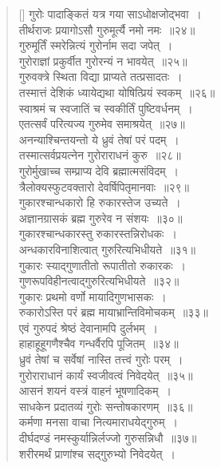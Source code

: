 \documentclass[twoside,12pt,notitlepage]{book}
\begin{document}
\begin{verse}[\versewidth]
गुरोः पादाङ्कितं यत्र गया साऽधोक्षजोद्भवा~।\\[-6pt]
तीर्थराजः प्रयागोऽसौ गुरुमूर्त्यै नमो नमः~॥२४॥\\
गुरुमूर्तिं स्मरेन्नित्यं गुरोर्नाम सदा जपेत्~।\\[-6pt]
गुरोराज्ञां प्रकुर्वीत गुरोरन्यं न भावयेत्~॥२५॥\\
गुरुवक्त्रे स्थिता  विद्या प्राप्यते तत्प्रसादतः~।\\[-6pt]
तस्मात्तं देशिकं ध्यायेद्यथा योषित्प्रियं स्वकम्~॥२६॥\\
स्वाश्रमं च स्वजातिं च स्वकीर्तिं पुष्टिवर्धनम्~।\\[-6pt]
एतत्सर्वं परित्यज्य गुरुमेव समाश्रयेत्~॥२७॥\\
अनन्याश्चिन्तयन्तो ये ध्रुवं तेषां परं पदम्~।\\[-6pt]
तस्मात्सर्वप्रयत्नेन गुरोराराधनं कुरु~॥२८॥\\
गुरोर्मुखाच्च सम्प्राप्य देवि ब्रह्मात्मसंविदम्~।\\[-6pt]
त्रैलोक्यस्फुटवक्तारो देवर्षिपितृमानवाः~॥२९॥\\
गुकारश्चान्धकारो हि रुकारस्तेज उच्यते~।\\[-6pt]
अज्ञानग्रासकं ब्रह्म गुरुरेव न संशयः~॥३०॥\\
गुकारश्चान्धकारस्तु रुकारस्तन्निरोधकः~।\\[-6pt]
अन्धकारविनाशित्वात् गुरुरित्यभिधीयते~॥३१॥\\
गुकारः स्याद्गुणातीतो रूपातीतो रुकारकः~।\\[-6pt]
गुणरूपविहीनत्वाद्गुरुरित्यभिधीयते~॥३२॥\\
गुकारः प्रथमो वर्णो मायादिगुणभासकः~।\\[-6pt]
रुकारोऽस्ति परं ब्रह्म  मायाभ्रान्तिविमोचकम्~॥३३॥\\
एवं गुरुपदं श्रेष्ठं देवानामपि दुर्लभम्~।\\[-6pt]
हाहाहूहूगणैश्चैव गन्धर्वैरपि पूजितम्~॥३४॥\\
ध्रुवं तेषां च सर्वेषां नास्ति तत्त्वं गुरोः परम्~।\\[-6pt]
गुरोराराधानं कार्यं स्वजीवत्वं निवेदयेत्~॥३५॥\\
आसनं शयनं वस्त्रं वाहनं भूषणादिकम्~।\\[-6pt]
साधकेन प्रदातव्यं गुरोः सन्तोषकारणम्~॥३६॥\\
कर्मणा मनसा वाचा नित्यमाराधयेद्गुरुम्~।\\[-6pt]
दीर्घदण्डं नमस्कुर्यान्निर्लज्जो गुरुसन्निधौ~॥३७॥\\
शरीरमर्थं प्राणांश्च सद्गुरुभ्यो निवेदयेत्~।\\[-6pt]

\end{verse}
\end{document}

